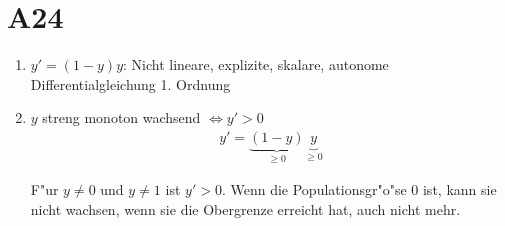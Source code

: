 \documentclass[fleqn,12pt]{scrartcl}
\begin{document}
\section{A24}
\begin{enumerate}
	\item
		$y' = (1-y)y$: Nicht lineare, explizite, skalare, autonome Differentialgleichung 1. Ordnung
	\item
		$y$ streng monoton wachsend $\Leftrightarrow y' > 0$
		\begin{align*}
			y' = \underbrace{(1-y)}_{\geq 0}\underbrace{y}_{\geq 0}
		\end{align*}

		F"ur $y\neq 0$ und $y\neq 1$ ist $y' > 0$. Wenn die Populationsgr"o"se 0 ist, kann sie nicht wachsen, wenn sie die Obergrenze erreicht hat, auch nicht mehr.
		

\end{enumerate}
\end{document}
